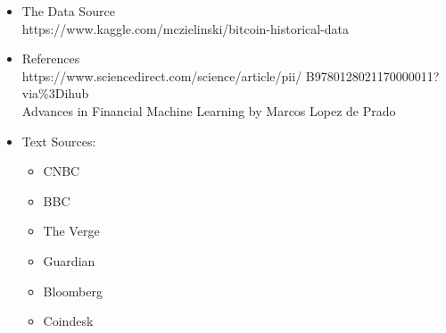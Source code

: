 \documentclass[%
aip,
amsmath,amssymb,
reprint,%
]{revtex4-1}
\begin{document}


\begin{itemize}
\item The Data Source\\
https://www.kaggle.com/mczielinski/bitcoin-historical-data 
\item References \\
https://www.sciencedirect.com/science/article/pii/
B9780128021170000011?via\%3Dihub\\

Advances in Financial Machine Learning by Marcos Lopez de Prado

\item Text Sources:
	\begin{itemize}
		\item CNBC
		\item BBC
		\item The Verge
		\item Guardian
		\item Bloomberg
		\item Coindesk
	\end{itemize}
\end{itemize}
\end{document}
